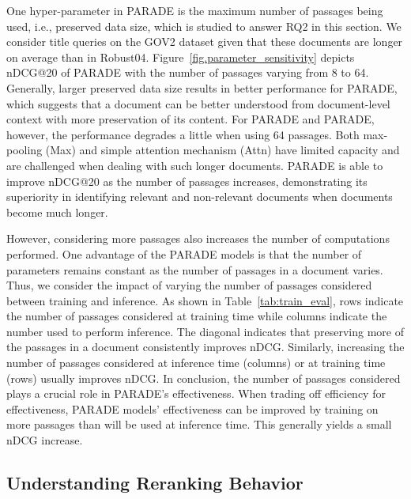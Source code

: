 \documentclass[11pt,a4paper]{article}
\newcommand{\parade}[1]{PARADE}
\begin{document}
One hyper-parameter in PARADE is the maximum number of passages being used, i.e., preserved data size, which is studied to answer RQ2 in this section.
We consider title queries on the GOV2 dataset given that these documents are longer on average than in Robust04.
Figure~\ref{fig.parameter_sensitivity} depicts nDCG@20 of PARADE with the number of passages varying from 8 to 64.
Generally, larger preserved data size results in better performance for PARADE, which suggests that a document can be better understood from document-level context with more preservation of its content.
For \parade{Max} and \parade{Attn}, however, the performance degrades a little when using 64 passages.
Both max-pooling (Max) and simple attention mechanism (Attn) have limited capacity and are challenged when dealing with such longer documents.
PARADE is able to improve nDCG@20 as the number of passages increases, demonstrating its superiority in identifying relevant and non-relevant documents when documents become much longer.

However, considering more passages also increases the number of computations performed.
One advantage of the PARADE models is that the number of parameters remains constant as the number of passages in a document varies.
Thus, we consider the impact of varying the number of passages considered between training and inference.
As shown in Table~\ref{tab:train_eval}, rows indicate the number of passages considered at training time while columns indicate the number used to perform inference.
The diagonal indicates that preserving more of the passages in a document consistently improves nDCG.
Similarly, increasing the number of passages considered at inference time (columns) or at training time (rows) usually improves nDCG.
In conclusion, the number of passages considered plays a crucial role in PARADE's effectiveness.
When trading off efficiency for effectiveness, PARADE models' effectiveness can be improved by training on more passages than will be used at inference time. This generally yields a small nDCG increase.


\subsection{Understanding Reranking Behavior} \label{sec.understanding}
\end{document}
